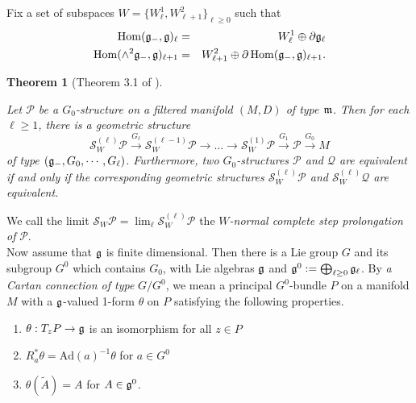 \documentclass[12pt]{amsart}
\theoremstyle{plain}
\newtheorem{theorem} {Theorem} [section]
\theoremstyle{definition}
\def\Hom{\operatorname{Hom}}
\begin{document}
Fix a set of subspaces $W=\{W^1_{\ell}, W^2_{\ell+1}\}_{\ell \geq 0}$ such that
\begin{eqnarray*}
 \Hom (\frak g_-,  \frak g )_{\ell} &= &W_{\ell}^1 \oplus \partial  \frak g_{\ell}\\
 \Hom(\wedge^2\frak g_-,   \frak g )_{\ell+1} &= &W_{\ell+1}^2 \oplus \partial \Hom(\frak g_-,  \frak g )_{\ell+1} .
 \end{eqnarray*}


\begin{theorem} [Theorem 3.1  of \cite{HM}] \label{thm:prolongation methods}

  Let $\mathscr P$ be a $G_0$-structure on a filtered manifold $(M,D)$ of type $\frak m$.
  Then for each $\ell \geq 1$, there is a geometric structure
 $$  \mathscr S_W^{(\ell)}\mathscr P \stackrel{G_{\ell}}{\longrightarrow} \mathscr S_W^{(\ell-1)}\mathscr P \longrightarrow \dots \longrightarrow \mathscr S_W^{(1)}\mathscr P \stackrel{G_1}{\longrightarrow} \mathscr P \stackrel{G_0}{\longrightarrow} M $$
 of type $(\frak g_-, G_0, \cdots, G_{\ell})$.
  Furthermore, two $G_0$-structures $\mathscr P$ and $\mathscr Q$ are   equivalent if and only if the corresponding geometric structures $\mathscr S_W^{(\ell)}\mathscr P$ and $\mathscr S_W^{(\ell)}\mathscr Q$ are  equivalent.
\end{theorem}

We call the limit $\mathscr S_W \mathscr P=\lim_{\ell} \mathscr S_W^{(\ell)}\mathscr P$ the {\it $W$-normal complete step prolongation of} $\mathscr P$. \\

Now
 assume that  $\frak g$ is finite dimensional. Then there is a Lie group $G$ and its subgroup $G^0$ which contains $G_0$, with Lie algebras $\frak g$ and $\frak g^0:=\bigoplus _{\ell \geq 0} \frak g_{\ell}$. %
 By {\it a Cartan connection of type} $G/G^0$, we mean a principal $G^0$-bundle $P$ on a manifold $M$ with a $\frak g$-valued 1-form $\theta$ on $P$ satisfying the following properties.
\begin{enumerate}
\item $\theta: T_zP \rightarrow \frak g$ is an isomorphism for all $z  \in P$
\item $R_a^* \theta = \mathrm{Ad} (a)^{-1}\theta$ for $a \in G^0$
\item $\theta(\widetilde A) =A $ for $A \in \frak g^0$.
\end{enumerate}
\end{document}
